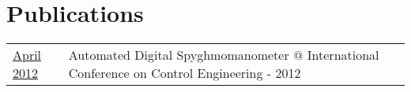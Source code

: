\documentclass[]{bigfatnoob-resume}
\begin{document}
\begin{minipage}[t]{0.66\textwidth}

\section{Publications} 
\begin{tabular}{p{2cm}p{9.2cm}}
	\href{http://sandeepmohan.com/files/Digital_Sphygmomanometer.pdf}{April 2012} & {\ibf Automated Digital Spyghmomanometer} $@$ International Conference on Control Engineering - 2012\\
\end{tabular}
\sectionsep

\end{minipage} 
\end{document}
